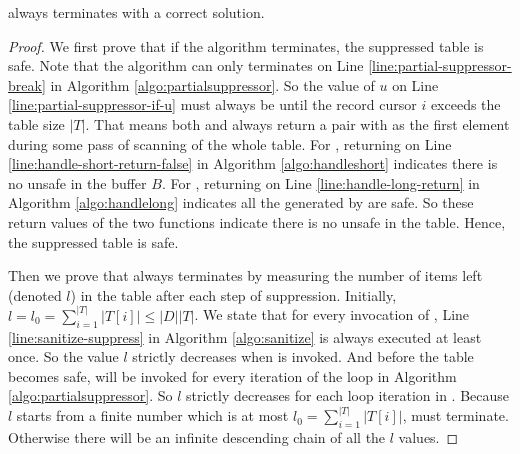 \begin{theorem}
\label{CorrectnessOfPartialSuppressor}
  \PartialSuppressor always terminates with a correct solution.
\end{theorem}
\begin{proof}
We first prove that if the algorithm terminates, the suppressed table is safe.
Note that the algorithm can only terminates on Line \ref{line:partial-suppressor-break}
  in Algorithm \ref{algo:partialsuppressor}.
So the value of $u$ on Line \ref{line:partial-suppressor-if-u} must always be \FALSE
  until the record cursor $i$ exceeds the table size $|T|$.
That means both \HandleShortRecords and \HandleLongRecord always return
  a pair with \FALSE as the first element during some pass of scanning of the whole table.
For \HandleShortRecords, returning \FALSE on Line \ref{line:handle-short-return-false}
  in Algorithm \ref{algo:handleshort} indicates there is no unsafe \qid in the buffer $B$.
For \HandleLongRecord, returning \FALSE on Line \ref{line:handle-long-return}
  in Algorithm \ref{algo:handlelong} indicates all the \qids generated by \Enum are safe.
So these return values of the two functions indicate there is no unsafe \qid in the table.
Hence, the suppressed table is safe.

Then we prove that \PartialSuppressor always terminates by measuring the
  number of items left (denoted $l$) in the table after each step of suppression.
Initially, $l=l_0=\sum_{i=1}^{|T|} |T[i]|\le |D| |T|$.
We state that for every invocation of \SanitizeBuffer, Line \ref{line:sanitize-suppress}
  in Algorithm \ref{algo:sanitize} is always executed at least once.
So the value $l$ strictly decreases when \SanitizeBuffer is invoked.
And before the table becomes safe, \SanitizeBuffer will be invoked for
  every iteration of the loop in Algorithm \ref{algo:partialsuppressor}.
So $l$ strictly decreases for each loop iteration in \PartialSuppressor.
Because $l$ starts from a finite number which is at most $l_0=\sum_{i=1}^{|T|} |T[i]|$,
  \PartialSuppressor must terminate.
Otherwise there will be an infinite descending chain of all the $l$ values.


\end{proof}
